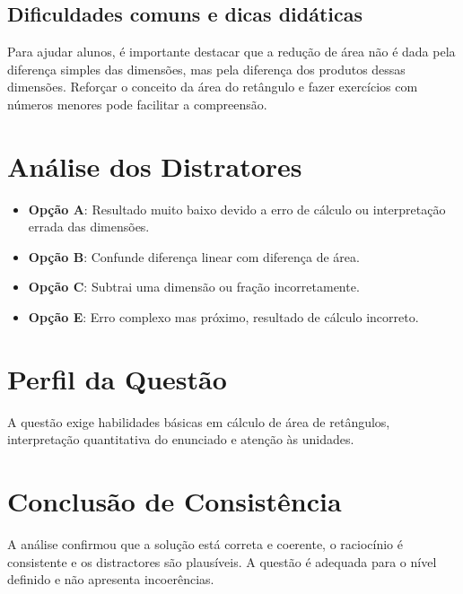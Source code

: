 \documentclass{article}
\begin{document}
\subsection{Dificuldades comuns e dicas didáticas}
Para ajudar alunos, é importante destacar que a redução de área não é dada pela diferença simples das dimensões, mas pela diferença dos produtos dessas dimensões. Reforçar o conceito da área do retângulo e fazer exercícios com números menores pode facilitar a compreensão.

\section{Análise dos Distratores}

\begin{itemize}
  \item \textbf{Opção A}: Resultado muito baixo devido a erro de cálculo ou interpretação errada das dimensões.
  \item \textbf{Opção B}: Confunde diferença linear com diferença de área.
  \item \textbf{Opção C}: Subtrai uma dimensão ou fração incorretamente.
  \item \textbf{Opção E}: Erro complexo mas próximo, resultado de cálculo incorreto.
\end{itemize}

\section{Perfil da Questão}
A questão exige habilidades básicas em cálculo de área de retângulos, interpretação quantitativa do enunciado e atenção às unidades.

\section{Conclusão de Consistência}
A análise confirmou que a solução está correta e coerente, o raciocínio é consistente e os distractores são plausíveis. A questão é adequada para o nível definido e não apresenta incoerências.
\end{document}
